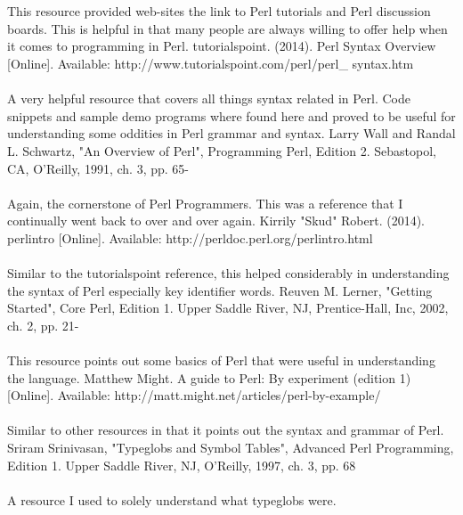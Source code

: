 \documentclass[11pt,a4paper]{article}
\begin{document}
\begin{thebibliography}{20}
        \\\\This resource provided web-sites the link to Perl tutorials and Perl discussion boards. This is helpful in that many people are always willing to offer help when it comes to programming in Perl.
        tutorialspoint.
        (2014).
        Perl Syntax Overview [Online].
        Available: http://www.tutorialspoint.com/perl/perl\_ syntax.htm
        \\\\A very helpful resource that covers all things syntax related in Perl. Code snippets and sample demo programs where found here and proved to be useful for understanding some oddities in Perl grammar and syntax.
        Larry Wall and Randal L. Schwartz,
        "An Overview of Perl",
        Programming Perl,
        Edition 2.
        Sebastopol, CA,
        O'Reilly,
        1991,
        ch. 3,
        pp. 65-
        \\\\Again, the cornerstone of Perl Programmers. This was a reference that I continually went back to over and over again.
        Kirrily "Skud" Robert.
        (2014).
        perlintro [Online].
        Available:
        http://perldoc.perl.org/perlintro.html
        \\\\Similar to the tutorialspoint reference, this helped considerably in understanding the syntax of Perl especially key identifier words.
        Reuven M. Lerner,
        "Getting Started",
        Core Perl,
        Edition 1.
        Upper Saddle River, NJ,
        Prentice-Hall, Inc,
        2002,
        ch. 2,
        pp. 21-
        \\\\This resource points out some basics of Perl that were useful in understanding the language.
        Matthew Might.
        A guide to Perl: By experiment (edition 1)[Online].
        Available:
        http://matt.might.net/articles/perl-by-example/
        \\\\Similar to other resources in that it points out the syntax and grammar of Perl.
        Sriram Srinivasan,
        "Typeglobs and Symbol Tables",
        Advanced Perl Programming,
        Edition 1.
        Upper Saddle River, NJ,
        O'Reilly,
        1997,
        ch. 3,
        pp. 68
        \\\\A resource I used to solely understand what typeglobs were.

\end{thebibliography}
\end{document}
